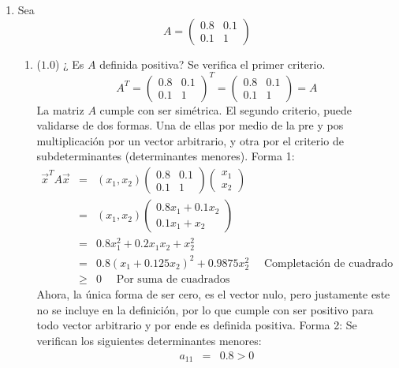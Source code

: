 \documentclass[12pt]{article}
\begin{document}
  \begin{enumerate}[leftmargin=*,widest=9]
    \item Sea
    \[
    A = \begin{pmatrix}
    0.8 & 0.1\\ 0.1 & 1
    \end{pmatrix}
    \]
    \begin{enumerate}[label=\alph*]
    \item (\(1.0\)) ¿ Es \(A\) definida positiva?
    Se verifica el primer criterio.
    \[
    A^T = \begin{pmatrix}
    0.8 & 0.1\\ 0.1 & 1
    \end{pmatrix}^T = \begin{pmatrix}
    0.8 & 0.1\\ 0.1 & 1
    \end{pmatrix} = A
    \]
    La matriz \(A\) cumple con ser simétrica.
    El segundo criterio, puede validarse de dos formas. Una de ellas por medio de la pre y pos multiplicación por un vector arbitrario, y otra por el criterio de subdeterminantes (determinantes menores).
    Forma 1:
    \begin{eqnarray*}
    \vec{x}^T A \vec{x} & = & (x_1, x_2) \begin{pmatrix}
    0.8 & 0.1\\ 0.1 & 1
    \end{pmatrix} \begin{pmatrix}
    x_1\\ x_2
    \end{pmatrix} \\
    & = & (x_1, x_2) \begin{pmatrix}
    0.8x_1+0.1x_2\\ 0.1x_1+x_2
    \end{pmatrix} \\
    & = & 0.8x_1^2 +0.2x_1x_2 + x_2^2\\
    & = & 0.8(x_1+0.125x_2)^2+0.9875x_2^2 \quad \text{ Completación de cuadrado} \\
    & \geq & 0 \quad \text{ Por suma de cuadrados}
    \end{eqnarray*}
    Ahora, la única forma de ser cero, es el vector nulo, pero justamente este no se incluye en la definición, por lo que cumple con ser positivo para todo vector arbitrario y por ende es definida positiva.
    Forma 2:
    Se verifican los siguientes determinantes menores:
   \begin{eqnarray*}
   a_{11} &=& 0.8 > 0 \\

\end{eqnarray*}
\end{enumerate}
\end{enumerate}
\end{document}
